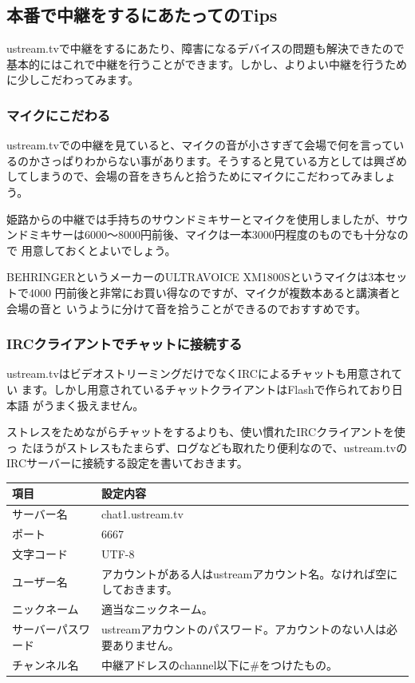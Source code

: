 \documentclass[mingoth,a4paper]{jsarticle}
\begin{document}
\subsection{本番で中継をするにあたってのTips}

ustream.tvで中継をするにあたり、障害になるデバイスの問題も解決できたので
基本的にはこれで中継を行うことができます。しかし、よりよい中継を行うため
に少しこだわってみます。

\subsubsection{マイクにこだわる}

ustream.tvでの中継を見ていると、マイクの音が小さすぎて会場で何を言ってい
るのかさっぱりわからない事があります。そうすると見ている方としては興ざめ
してしまうので、会場の音をきちんと拾うためにマイクにこだわってみましょう。

姫路からの中継では手持ちのサウンドミキサーとマイクを使用しましたが、サウ
ンドミキサーは6000〜8000円前後、マイクは一本3000円程度のものでも十分なので
用意しておくとよいでしょう。

BEHRINGERというメーカーのULTRAVOICE XM1800Sというマイクは3本セットで4000
円前後と非常にお買い得なのですが、マイクが複数本あると講演者と会場の音と
いうように分けて音を拾うことができるのでおすすめです。

\subsubsection{IRCクライアントでチャットに接続する}

ustream.tvはビデオストリーミングだけでなくIRCによるチャットも用意されてい
ます。しかし用意されているチャットクライアントはFlashで作られており日本語
がうまく扱えません。

ストレスをためながらチャットをするよりも、使い慣れたIRCクライアントを使っ
たほうがストレスもたまらず、ログなども取れたり便利なので、ustream.tvの
IRCサーバーに接続する設定を書いておきます。

\begin{center}
\begin{tabular}{|l|l|}
\hline
項目 & 設定内容 \\
\hline
サーバー名 & chat1.ustream.tv\\
ポート & 6667\\
文字コード & UTF-8\\
ユーザー名 & アカウントがある人はustreamアカウント名。なければ空にしておきます。\\
ニックネーム & 適当なニックネーム。\\
サーバーパスワード & ustreamアカウントのパスワード。アカウントのない人は必要ありません。\\
チャンネル名 & 中継アドレスのchannel以下に\#をつけたもの。\\
\hline
\end{tabular}
\end{center}
\end{document}
